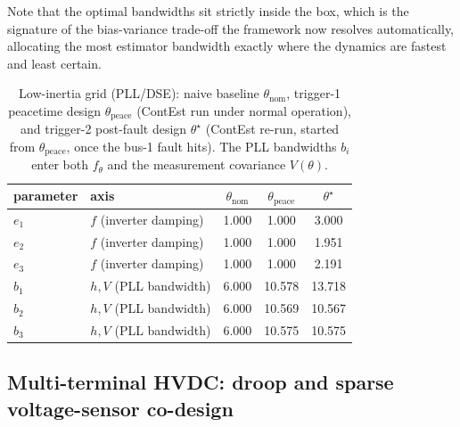 \documentclass[twocolumn,amsthm]{autart}
\begin{document}
Note that the optimal bandwidths sit strictly inside the box, which is
the signature of the bias-variance trade-off the framework now resolves
automatically, allocating the most estimator bandwidth exactly where the dynamics
are fastest and least certain.


\begin{table}[t]
\centering
\caption{Low-inertia grid (PLL/DSE): naive baseline $\theta_{\mathrm{nom}}$,
trigger-1 peacetime design $\theta_{\mathrm{peace}}$ (ContEst run under normal
operation), and trigger-2 post-fault design $\theta^\star$ (ContEst re-run,
started from $\theta_{\mathrm{peace}}$, once the bus-1 fault hits). The PLL
bandwidths $b_i$ enter both $f_\theta$ and the measurement covariance
$V(\theta)$.}
\label{tab:pll}
\begin{tabular}{llccc}
\hline
parameter & axis & $\theta_{\mathrm{nom}}$ & $\theta_{\mathrm{peace}}$ & $\theta^\star$ \\
\hline
$e_1$ & $f$ (inverter damping) & 1.000 & 1.000 & 3.000 \\
$e_2$ & $f$ (inverter damping) & 1.000 & 1.000 & 1.951 \\
$e_3$ & $f$ (inverter damping) & 1.000 & 1.000 & 2.191 \\
$b_1$ & $h,V$ (PLL bandwidth)  & 6.000 & 10.578 & 13.718 \\
$b_2$ & $h,V$ (PLL bandwidth)  & 6.000 & 10.569 & 10.567 \\
$b_3$ & $h,V$ (PLL bandwidth)  & 6.000 & 10.575 & 10.575 \\
\hline
\end{tabular}
\end{table}

\subsection{Multi-terminal HVDC: droop and sparse voltage-sensor co-design}
\label{sec:sim:mtdc}
\end{document}
